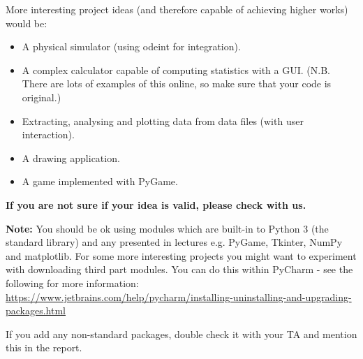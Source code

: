 \documentclass[12pt]{report}
\begin{document}
\bigskip

More interesting project ideas (and therefore capable of achieving higher works) would be:
\begin{itemize}
    \item A physical simulator (using odeint for integration).
    \item A complex calculator capable of computing statistics with a GUI. (N.B. There are lots of examples of this online, so make sure that your code is original.)
    \item Extracting, analysing and plotting data from data files (with user interaction).
    \item A drawing application.
    \item A game implemented with PyGame.
\end{itemize}

\textbf{If you are not sure if your idea is valid, please check with us.} 

\medskip

\textbf{Note:} You should be ok using modules which are built-in to Python 3 (the standard library) and any presented in lectures e.g. PyGame, Tkinter, NumPy and matplotlib. For some more interesting projects you might want to experiment with downloading third part modules. You can do this within PyCharm - see the following for more information: \url{https://www.jetbrains.com/help/pycharm/installing-uninstalling-and-upgrading-packages.html}

If you add any non-standard packages, double check it with your TA and mention this in the report.
\end{document}
